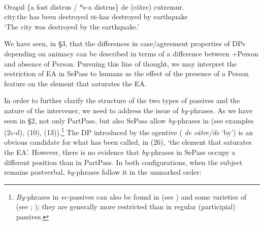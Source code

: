 \documentclass[output=paper]{langsci/langscibook}
\begin{document}
\ea%
            \label{ex:giurgea:28}\\
    \gll Oraşul \{a    fost  distrus      / *s-a      distrus\}   {de (către)} cutremur.\\
         city.the  has been destroyed  {}  \textsc{se-}has destroyed by            earthquake\\
    \glt ‘The city was destroyed by the earthquake.’
    \z

          

We have seen, in §3, that the differences in case\slash agreement properties of DPs depending on animacy can be described in terms of a difference between +Person and absence of Person. Pursuing this line of thought, we may interpret the restriction of EA in SePass to humans as the effect of the presence of a Person feature on the element that saturates the EA.

  In order to further clarify the structure of the two types of passives and the nature of the intervener, we need to address the issue of \textit{by-}phrases. As we have seen in §2, not only PartPass, but also SePass allow \textit{by-}phrases in  (see examples (2c-d), (10), (13)).\footnote{\textit{By-}phrases in \textit{se-}passives can also be found in  (see \citealt{MacDonald2017}) and some varieties of  (see \citealt{Authier1996}; \citealt{Zribi-Hertz2008}); they are generally more restricted than in regular (participial) passives.}  The DP introduced by the agentive  ( \textit{de către\slash de} ‘by’) is an obvious candidate for what has been called, in (26), ‘the element that saturates the EA’. However, there is no evidence that \textit{by-}phrases in SePass occupy a different position than in PartPass. In both configurations, when the subject remains postverbal, \textit{by-}phrases follow it in the unmarked order: 
\end{document}
